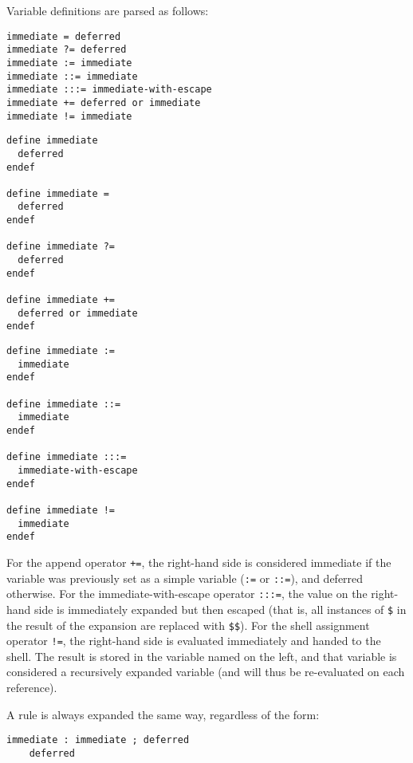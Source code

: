 Variable definitions are parsed as follows:
\begin{verbatim}
immediate = deferred
immediate ?= deferred
immediate := immediate
immediate ::= immediate
immediate :::= immediate-with-escape
immediate += deferred or immediate
immediate != immediate
\end{verbatim}

\begin{multicols*}{2}
\begin{verbatim}
define immediate
  deferred
endef

define immediate =
  deferred
endef

define immediate ?=
  deferred
endef

define immediate +=
  deferred or immediate
endef
\end{verbatim}

\begin{verbatim}
define immediate :=
  immediate
endef

define immediate ::=
  immediate
endef

define immediate :::=
  immediate-with-escape
endef

define immediate !=
  immediate
endef
\end{verbatim}
\end{multicols*}


For the append operator \texttt{+=}, the right-hand side is considered immediate if the variable was previously set as a simple variable (\texttt{:=} or \texttt{::=}), and deferred otherwise.
For the immediate-with-escape operator \texttt{:::=}, the value on the right-hand side is immediately expanded but then escaped (that is, all instances of \texttt{\$} in the result of the expansion are replaced with \texttt{\$\$}).
For the shell assignment operator \texttt{!=}, the right-hand side is evaluated immediately and handed to the shell. The result is stored in the variable named on the left, and that variable is considered a recursively expanded variable (and will thus be re-evaluated on each reference).

A rule is always expanded the same way, regardless of the form:
\begin{verbatim}
immediate : immediate ; deferred
    deferred
\end{verbatim}

%